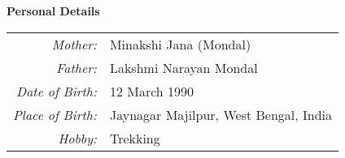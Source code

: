 \documentclass[12pt]{article}
\begin{document}
\newpage
\vspace{0.6cm}
\colorbox{gray!40}{\begin{minipage}{17.5cm}
\bf {Personal Details}
\end{minipage} }

\begin{minipage}{1.05\textwidth}
\vspace{0.4cm}
\begin{tabular}{ r l}
  {\emph {Mother:}} & Minakshi Jana (Mondal) \\[0.2cm]
  {\emph {Father:}} & Lakshmi Narayan Mondal \\[0.2cm]
  {\emph {Date of Birth:}} & 12 March 1990 \\[0.2cm]
  {\emph {Place of Birth:}} & Jaynagar Majilpur, West Bengal, India \\[0.2cm]
  {\emph {Hobby:}} & Trekking \\[0.2cm]
\end{tabular}
\end{minipage} 
\end{document}
